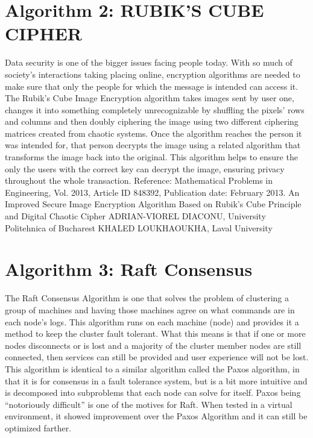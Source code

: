\documentclass[11pt]{article}
\begin{document}
\section{Algorithm 2: RUBIK'S CUBE CIPHER}
Data security is one of the bigger issues facing people today. With so much of society's interactions taking placing online, encryption algorithms are needed to make sure that only the people for which the message is intended can access it. The Rubik's Cube Image Encryption algorithm takes images sent by user one, changes it into something completely unrecognizable by shuffling the pixels' rows and columns and then doubly ciphering the image using two different ciphering matrices created from chaotic systems. Once the algorithm reaches the person it was intended for, that person decrypts the image using a related algorithm that transforms the image back into the original. This algorithm helps to ensure the only the users with the correct key can decrypt the image, ensuring privacy throughout the whole transaction. 
Reference: Mathematical Problems in Engineering, Vol. 2013, Article ID 848392, Publication date: February 2013. An Improved Secure Image Encryption Algorithm Based on Rubik's Cube Principle and Digital Chaotic Cipher
ADRIAN-VIOREL DIACONU, University Politehnica of Bucharest
KHALED LOUKHAOUKHA, Laval University

\section{Algorithm 3: Raft Consensus}
The Raft Consensus Algorithm is one that solves the problem of clustering a group of machines and having those machines agree on what commands are in each node's logs. This algorithm runs on each machine (node) and provides it a method to keep the cluster fault tolerant. What this means is that if one or more nodes disconnects or is lost and a majority of the cluster member nodes are still connected, then services can still be provided and user experience will not be lost. This algorithm is identical to a similar algorithm called the Paxos algorithm, in that it is for consensus in a fault tolerance system, but is a bit more intuitive and is decomposed into subproblems that each node can solve for itself. Paxos being “notoriously difficult” is one of the motives for Raft. When tested in a virtual environment, it showed improvement over the Paxos Algorithm and it can still be optimized farther.
\end{document}
